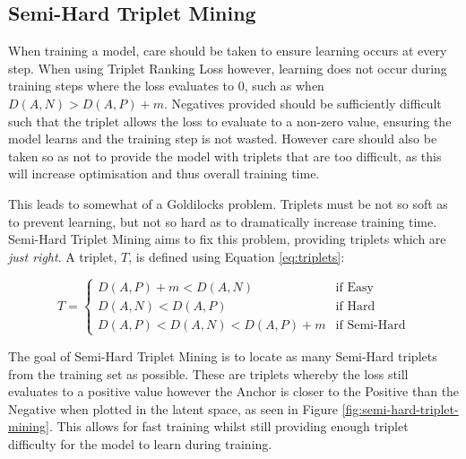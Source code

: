 \subsection{Semi-Hard Triplet Mining}\label{ch:ID,sec:SNNBackground,sub:SemiHardTripletMining}

When training a model, care should be taken to ensure learning occurs at every step. When using Triplet Ranking Loss however, learning does not occur during training steps where the loss evaluates to 0, such as when $D(A, N) > D(A, P) + m$. Negatives provided should be sufficiently difficult such that the triplet allows the loss to evaluate to a non-zero value, ensuring the model learns and the training step is not wasted. However care should also be taken so as not to provide the model with triplets that are too difficult, as this will increase optimisation and thus overall training time. 

This leads to somewhat of a Goldilocks problem. Triplets must be not so soft as to prevent learning, but not so hard as to dramatically increase training time. Semi-Hard Triplet Mining aims to fix this problem, providing triplets which are \textit{just right}. A triplet, $T$, is defined using Equation \ref{eq:triplets}:

\begin{equation}
	\label{eq:triplets}
	T =
	\begin{cases}
		D(A, P) + m < D(A, N) & \text{if Easy}\\
		D(A, N) < D(A, P) & \text{if Hard}\\
		D(A, P) < D(A, N) < D(A, P) + m & \text{if Semi-Hard}
	\end{cases}       
\end{equation}

The goal of Semi-Hard Triplet Mining is to locate as many Semi-Hard triplets from the training set as possible. These are triplets whereby the loss still evaluates to a positive value however the Anchor is closer to the Positive than the Negative when plotted in the latent space, as seen in Figure \ref{fig:semi-hard-triplet-mining}. This allows for fast training whilst still providing enough triplet difficulty for the model to learn during training. 

